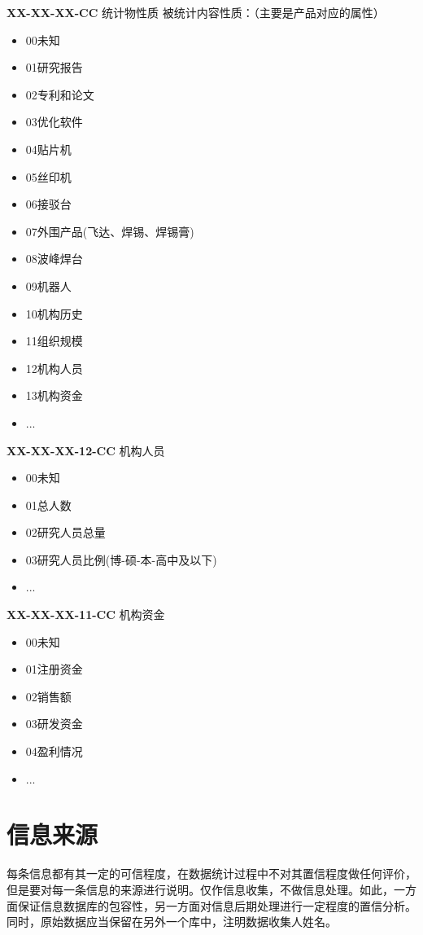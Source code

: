 \documentclass[a4paper,12pt]{article}
\begin{document}
\textbf{XX-XX-XX-CC} 统计物性质
被统计内容性质：（主要是产品对应的属性）
\begin{itemize}
  \item 00未知%
  \item 01研究报告%
  \item 02专利和论文%
  \item 03优化软件
  \item 04贴片机
  \item 05丝印机
  \item 06接驳台
  \item 07外围产品(飞达、焊锡、焊锡膏)
  \item 08波峰焊台
  \item 09机器人
  \item 10机构历史
  \item 11组织规模
  \item 12机构人员
  \item 13机构资金
  \item ...
\end{itemize}

\textbf{XX-XX-XX-12-CC} 机构人员
\begin{itemize}
  \item 00未知%
  \item 01总人数
  \item 02研究人员总量
  \item 03研究人员比例(博-硕-本-高中及以下)
  \item ...
\end{itemize}

\textbf{XX-XX-XX-11-CC} 机构资金
\begin{itemize}
  \item 00未知%
  \item 01注册资金
  \item 02销售额
  \item 03研发资金
  \item 04盈利情况
  \item ...
\end{itemize}

\section{信息来源}
每条信息都有其一定的可信程度，在数据统计过程中不对其置信程度做任何评价，但是要对每一条信息的来源进行说明。仅作信息收集，不做信息处理。如此，一方面保证信息数据库的包容性，另一方面对信息后期处理进行一定程度的置信分析。 同时，原始数据应当保留在另外一个库中，注明数据收集人姓名。
\end{document}
